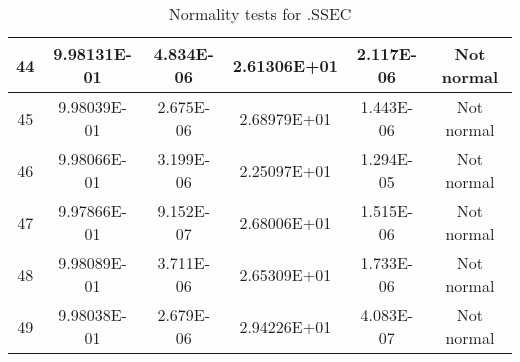 \begin{table}[h]
\begin{tabular}{|c|c|c|c|c|c|}
		44 & 9.98131E-01 & 4.834E-06 & 2.61306E+01 & 2.117E-06 & Not normal\\\hline
		45 & 9.98039E-01 & 2.675E-06 & 2.68979E+01 & 1.443E-06 & Not normal\\\hline
		46 & 9.98066E-01 & 3.199E-06 & 2.25097E+01 & 1.294E-05 & Not normal\\\hline
		47 & 9.97866E-01 & 9.152E-07 & 2.68006E+01 & 1.515E-06 & Not normal\\\hline
		48 & 9.98089E-01 & 3.711E-06 & 2.65309E+01 & 1.733E-06 & Not normal\\\hline
		49 & 9.98038E-01 & 2.679E-06 & 2.94226E+01 & 4.083E-07 & Not normal\\\hline
	\end{tabular}
	\caption{Normality tests for .SSEC}
\end{table}
